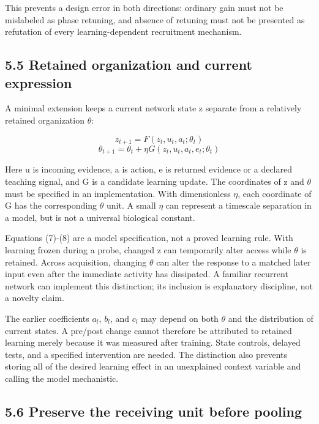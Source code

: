 \documentclass[
  american,
  11pt,
  letterpaper,
]{article}
\begin{document}
This prevents a design error in both directions: ordinary gain must not be mislabeled as phase retuning, and absence of retuning must not be presented as refutation of every learning-dependent recruitment mechanism.

\subsection{5.5 Retained organization and current expression}\label{retained-organization-and-current-expression}

A minimal extension keeps a current network state z separate from a relatively retained organization \(\theta\):

\begin{equation}
z_{t+1}=F(z_t,u_t,a_t;\theta_t)\tag{7}
\end{equation} \begin{equation}
\theta_{t+1}=\theta_t+\eta G(z_t,u_t,a_t,e_t;\theta_t)\tag{8}
\end{equation}

Here u is incoming evidence, a is action, e is returned evidence or a declared teaching signal, and G is a candidate learning update. The coordinates of z and \(\theta\) must be specified in an implementation. With dimensionless \(\eta\), each coordinate of G has the corresponding \(\theta\) unit. A small \(\eta\) can represent a timescale separation in a model, but is not a universal biological constant.

Equations (7)-(8) are a model specification, not a proved learning rule. With learning frozen during a probe, changed z can temporarily alter access while \(\theta\) is retained. Across acquisition, changing \(\theta\) can alter the response to a matched later input even after the immediate activity has dissipated. A familiar recurrent network can implement this distinction; its inclusion is explanatory discipline, not a novelty claim.

The earlier coefficients \(a_l\), \(b_l\), and \(c_l\) may depend on both \(\theta\) and the distribution of current states. A pre/post change cannot therefore be attributed to retained learning merely because it was measured after training. State controls, delayed tests, and a specified intervention are needed. The distinction also prevents storing all of the desired learning effect in an unexplained context variable and calling the model mechanistic.

\subsection{5.6 Preserve the receiving unit before pooling}\label{preserve-the-receiving-unit-before-pooling}
\end{document}
